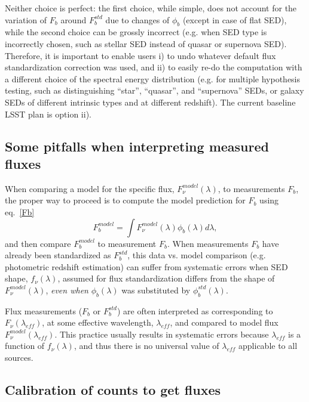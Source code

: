 \documentclass{emulateapj}
\begin{document}
Neither choice is perfect: the first choice, while simple, does not account for the variation of $F_b$ around
$F^{std}_b$ due to changes of $\phi_b$ (except in case of flat SED), while the second choice
can be grossly incorrect (e.g. when SED type is incorrectly chosen, such as stellar SED instead
of quasar or supernova SED). Therefore, it is important to enable users i) to undo whatever default 
flux standardization correction was used, and ii) to easily re-do the computation with a different choice 
of the spectral energy distribution (e.g. for multiple hypothesis testing, such as distinguishing
``star'', ``quasar'', and ``supernova'' SEDs, or galaxy SEDs of different intrinsic types and at 
different redshift). The current baseline LSST plan is option ii). 

\subsection{Some pitfalls when interpreting measured fluxes}

When comparing a model for the specific flux, $F_\nu^{model}(\lambda)$, to  
measurements $F_b$, the proper way to proceed is to compute the model prediction 
for $F_b$ using eq.~\ref{Fb}
\begin{equation}
\label{FbModel}
             F^{model}_b = \int{F_\nu^{model}(\lambda) \phi_b(\lambda) d\lambda},
\end{equation}
and then compare $F^{model}_b$ to measurement $F_b$.  
When measurements $F_b$ have already been standardized as $F^{std}_b$, 
this data vs. model comparison (e.g. photometric redshift estimation) can 
suffer from systematic errors when SED shape, $f_\nu(\lambda)$,  assumed 
for flux standardization differs from the shape of $F_\nu^{model}(\lambda)$,
{\it even when} $\phi_b(\lambda)$ was substituted by $\phi^{std}_b(\lambda)$. 

Flux measurements ($F_b$ or $F^{std}_b$) are often interpreted as corresponding to 
$F_\nu(\lambda_{eff})$, at some effective wavelength, $\lambda_{eff}$, and compared 
to model flux $F_\nu^{model}(\lambda_{eff})$. This practice usually results in systematic
errors because $\lambda_{eff}$ is a function of $f_\nu(\lambda)$, and thus there
is no universal value of $\lambda_{eff}$ applicable to all sources. 


\subsection{Calibration of counts to get fluxes} 
\end{document}
